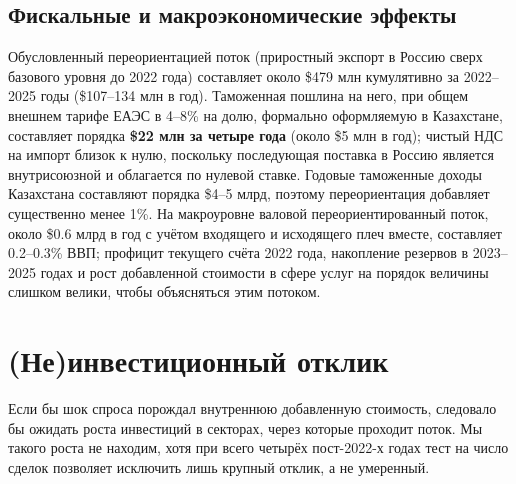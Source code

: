 \documentclass[12pt]{article}
\begin{document}
\subsection{Фискальные и макроэкономические эффекты}

Обусловленный переориентацией поток (приростный экспорт в Россию сверх базового уровня до
2022 года) составляет около \$479 млн кумулятивно за 2022--2025 годы (\$107--134 млн в год).
Таможенная пошлина на него, при общем внешнем тарифе ЕАЭС в 4--8\% на долю, формально
оформляемую в Казахстане, составляет порядка \textbf{\$22 млн за четыре года} (около
\$5 млн в год); чистый НДС на импорт близок к нулю, поскольку последующая поставка в Россию
является внутрисоюзной и облагается по нулевой ставке. Годовые таможенные доходы Казахстана
составляют порядка \$4--5 млрд, поэтому переориентация добавляет существенно менее 1\%. На
макроуровне валовой переориентированный поток, около \$0.6 млрд в год с учётом входящего и
исходящего плеч вместе, составляет 0.2--0.3\% ВВП; профицит текущего счёта 2022 года,
накопление резервов в 2023--2025 годах и рост добавленной стоимости в сфере услуг на порядок
величины слишком велики, чтобы объясняться этим потоком.

\section{(Не)инвестиционный отклик}\label{sec:investment}

Если бы шок спроса порождал внутреннюю добавленную стоимость, следовало бы ожидать роста
инвестиций в секторах, через которые проходит поток. Мы такого роста не находим, хотя при
всего четырёх пост-2022-х годах тест на число сделок позволяет исключить лишь крупный
отклик, а не умеренный.
\end{document}
